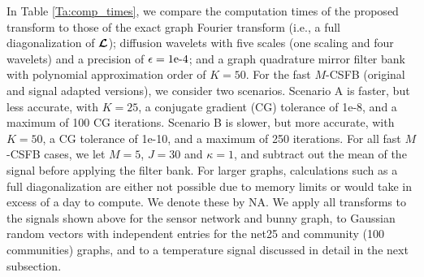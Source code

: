 \documentclass[journal, 10pt]{IEEEtran}
\begin{document}
In Table \ref{Ta:comp_times}, %
we compare the computation times of the proposed transform to those of the exact graph Fourier transform (i.e., a full diagonalization of $\boldsymbol{\mathcal{L}}$); diffusion wavelets \cite{coifman2006diffusion} with five scales (one scaling and four wavelets) and a precision of $\epsilon=1\hbox{e-4}$; and a graph quadrature mirror filter bank \cite{narang2012perfect} with polynomial approximation order of $K=50$. 
For the fast $M$-CSFB (original and signal adapted versions), we consider two scenarios. Scenario A is faster, but less accurate, with $K=25$, a conjugate gradient (CG) tolerance of 1e-8, and a maximum of 100 CG iterations. Scenario B is slower, but more accurate, with $K=50$, a CG tolerance of 1e-10, and a maximum of 250 iterations. For all fast $M$-CSFB cases, we let $M=5$, $J=30$ and $\kappa=1$, and subtract out the mean of the signal before applying the filter bank. For larger graphs, calculations such as a  full diagonalization are either not possible due to memory limits or would take in excess of a day to compute. We denote these by NA. 
We apply all transforms to the signals shown above for the sensor network and bunny graph, %
to Gaussian random vectors with independent entries for the 
net25 and community (100 communities) graphs, and to a temperature signal discussed in detail in the next subsection.
\end{document}

